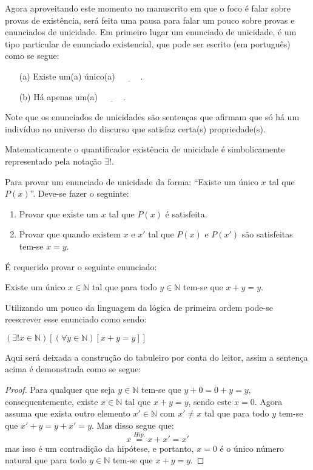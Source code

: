 Agora aproveitando este momento no manuscrito em que o foco é falar sobre provas de existência, será feita uma pausa para falar um pouco sobre provas e enunciados de unicidade. Em primeiro lugar um enunciado de unicidade, é um tipo particular de enunciado existencial, que pode ser escrito (em português) como se segue:
\begin{itemize}
	\item[(a)] Existe um(a) único(a) $\underline{\ \ \ \ \ \ \ \ \ \ \ \ }$.
	\item[(b)] Há apenas um(a) $\underline{\ \ \ \ \ \ \ \ \ \ \ \ }$.
\end{itemize} 

Note que os enunciados de unicidades são sentenças que afirmam que só há um indivíduo no universo do discurso que satisfaz certa(s) propriedade(s).

\begin{rema}
	Matematicamente o quantificador existência de unicidade é simbolicamente representado pela notação $\exists!$.  
\end{rema}

\begin{method}
	Para provar um enunciado de unicidade da forma: ``Existe um único $x$ tal que $P(x)$''. Deve-se fazer o seguinte:
	\begin{enumerate}
		\item Provar que existe um $x$ tal que $P(x)$ é satisfeita.
		\item Provar que quando existem $x$ e $x'$ tal que $P(x)$ e $P(x')$ são satisfeitas tem-se $x = y$.
	\end{enumerate}
\end{method}


\begin{exem}\label{exe:ProvaExi3}
	É requerido provar o seguinte enunciado:
	\begin{center}
		Existe um único $x \in \mathbb{N}$ tal que para todo $y \in \mathbb{N}$ tem-se que $x + y = y$.
	\end{center}
	Utilizando um pouco da linguagem da lógica de primeira ordem pode-se reescrever esse enunciado como sendo:
	\begin{center}
		$(\exists! x \in \mathbb{N})[(\forall y \in \mathbb{N})[x + y = y]]$
	\end{center}
	Aqui será deixada a construção do tabuleiro por conta do leitor, assim a sentença acima é demonstrada como se segue:
	\begin{proof}
		Para qualquer que seja $y \in \mathbb{N}$ tem-se que $y + 0 = 0 + y = y$, consequentemente, existe $x \in \mathbb{N}$ tal que $x + y = y$, sendo este $x = 0$. Agora assuma que exista outro elemento $x' \in \mathbb{N}$ com $x' \neq x$ tal que para todo $y$ tem-se que $x' + y = y + x' = y$. Mas disso segue que:
		$$x \stackrel{Hip.}{=} x + x' = x'$$
		mas isso é um contradição da hipótese, e portanto, $x = 0$ é o único número natural que para todo $y \in \mathbb{N}$ tem-se que $x + y = y$.
	\end{proof}
\end{exem}

